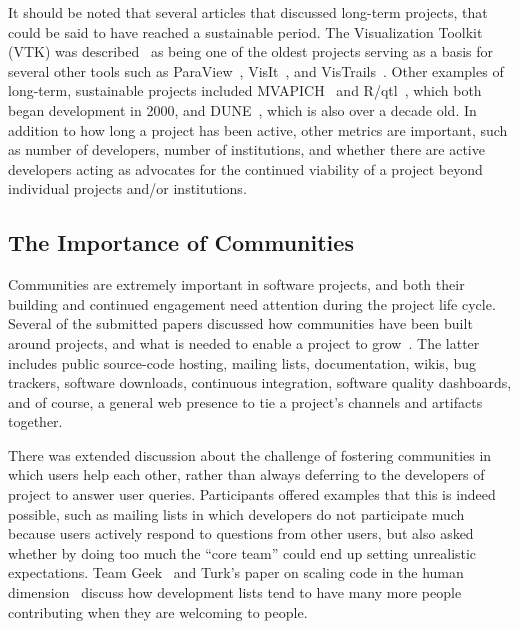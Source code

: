 \documentclass[11pt, oneside]{amsart}
\begin{document}
It should be noted that several articles that discussed long-term projects, that
could be said to have reached a sustainable period. The Visualization Toolkit
(VTK) was described~\cite{Hanwell_WSSSPE} as being one of the oldest projects
serving as a basis for several other tools such as ParaView~\cite{Hanwell_WSSSPE}, VisIt~\cite{Ahern_WSSSPE}, and VisTrails~\cite{Koop_WSSSPE}. Other examples of
long-term, sustainable projects included MVAPICH~\cite{Panda_WSSSPE} and R/qtl~\cite{Broman_WSSSPE}, which both began development
in 2000, and DUNE~\cite{Blatt_WSSSPE}, which is also over a decade old. In
addition to how long a project has been active, other metrics are important,
such as number of developers, number of institutions, and whether there are
active developers acting as advocates for the continued viability of a project
beyond individual projects and/or institutions.

\subsection{The Importance of Communities}

Communities are extremely important in software projects, and both
their building and continued engagement need attention during the
project life cycle. Several of the submitted papers 
discussed how communities have been built around projects, and what is
needed to enable a project to grow~\cite{Crusoe_WSSSPE, Hanwell_WSSSPE, Christopherson_WSSSPE, Cranston_WSSSPE, Terrel_WSSSPE}. The latter includes public
source-code hosting, mailing lists, documentation, wikis, bug
trackers, software downloads, continuous integration, software quality
dashboards, and of course, a general web presence to tie a project's
channels and artifacts together.

There was extended discussion about the challenge of fostering
communities in which users help each other, rather than always
deferring to the developers of project to answer user
queries. Participants offered examples that this is indeed possible,
such as mailing lists in which developers do not participate much
because users actively respond to questions from other users, but also
asked whether by doing too much the ``core team'' could end up setting
unrealistic expectations. Team Geek~\cite{opac-b1134063} and Turk's
paper on scaling code in the human
dimension~\cite{Turk:2013:SCH:2484762.2484782} discuss how development
lists tend to have many more people contributing when they are
welcoming to people.
\end{document}
